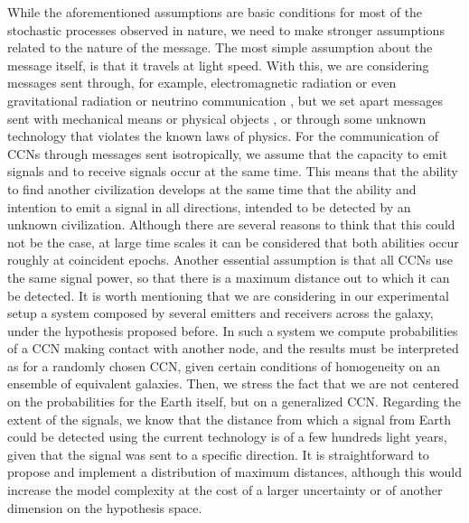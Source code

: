 \documentclass[crop]{CSLB}
\newcommand{\ceti}{CCN}
\newcommand{\cetis}{CCNs}
\begin{document}
While the aforementioned assumptions are basic conditions for most of
the stochastic processes observed in nature, we need to make stronger
assumptions related to the nature of the message.
%
The most simple assumption about the message itself, is that it
travels at light speed.
%
With this, we are considering messages sent through, for example,
electromagnetic radiation or even gravitational radiation or neutrino
communication \citep{hippke_interstellar_2017, wright_how_2018}, but we set
apart messages sent with mechanical means or physical objects
\citep[e.g., ][]{Armstrong2013, barlow_galactic_2013}, or through some unknown technology
that violates the known laws of physics.
% 
For the communication of \cetis{} through messages sent isotropically,
we assume that the capacity to emit signals and to receive signals
occur at the same time.
%
This means that the ability to find another civilization develops at
the same time that the ability and intention to emit a signal in all
directions, intended to be detected by an unknown civilization.
%
Although there are several reasons to think that this could not be the
case, at large time scales it can be considered that both abilities
occur roughly at coincident epochs.
%
Another essential assumption is that all \cetis{} use the same signal
power, so that there is a maximum distance out to which it can be
detected.
%
It is worth mentioning that we are considering in our experimental
setup a system composed by several emitters and receivers across the
galaxy, under the hypothesis proposed before.
%
In such a system we compute probabilities of a \ceti{} making contact
with another node, and the results must be interpreted as for a
randomly chosen \ceti{}, given certain conditions of homogeneity on an
ensemble of equivalent galaxies.
%
Then, we stress the fact that we are not centered on the probabilities
for the Earth itself, but on a generalized \ceti{}.
%
Regarding the extent of the signals, we know that the distance from
which a signal from Earth could be detected using the current
technology is of a few hundreds light years, given that the signal was
sent to a specific direction.
%
%
It is straightforward to propose and implement a distribution of
maximum distances, although this would increase the model complexity
at the cost of a larger uncertainty or of another dimension on the
hypothesis space.
%
\end{document}
